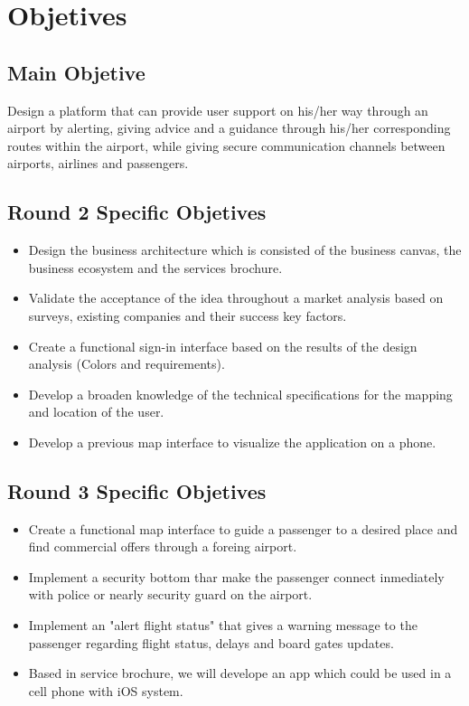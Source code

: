 \documentclass[]{article}
\begin{document}
\section{Objetives}

\subsection{Main Objetive}

Design a platform that can provide user support on his/her way through an airport by alerting, giving advice and a guidance through his/her corresponding routes within the airport, while giving secure communication channels between airports, airlines and passengers.\\
[0.7cm]

\subsection{Round 2 Specific Objetives}
\begin{itemize}
	\item Design the business architecture which is consisted of the business canvas, the business ecosystem and the services brochure.
	\item Validate the acceptance of the idea throughout a market analysis based on surveys, existing companies and their success key factors.
	\item Create a functional sign-in interface based on the results of the design analysis (Colors and requirements). 
	\item Develop a broaden knowledge of the technical specifications for the mapping and location of the user.
	\item Develop a previous map interface to visualize the application on a phone.\\
[0.7cm]
\end{itemize}

\subsection{Round 3 Specific Objetives}
\begin{itemize}
	\item Create a functional map interface to guide a passenger to a desired place and find commercial offers through a foreing airport.
	\item Implement a security bottom thar make the passenger connect inmediately with police or nearly security guard on the airport.
	\item Implement an "alert flight status" that gives a warning message to the passenger regarding flight status, delays and board gates updates. 
	\item Based in service brochure, we will develope an app which could be used in a cell phone with iOS system.\\
[0.6cm]
\end{itemize}
\end{document}
